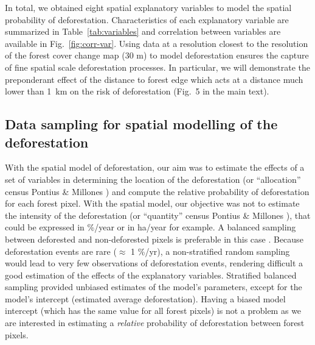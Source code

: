 \documentclass[
  12pt,
]{article}
\begin{document}
In total, we obtained eight spatial explanatory variables to model the spatial probability of deforestation. Characteristics of each explanatory variable are summarized in Table~\ref{tab:variables} and correlation between variables are available in Fig.~\ref{fig:corr-var}. Using data at a resolution closest to the resolution of the forest cover change map (30 m) to model deforestation ensures the capture of fine spatial scale deforestation processes. In particular, we will demonstrate the preponderant effect of the distance to forest edge which acts at a distance much lower than 1~km on the risk of deforestation (Fig.~5 in the main text).

\hypertarget{data-sampling-for-spatial-modelling-of-the-deforestation}{%
\subsection{Data sampling for spatial modelling of the deforestation}\label{data-sampling-for-spatial-modelling-of-the-deforestation}}

With the spatial model of deforestation, our aim was to estimate the effects of a set of variables in determining the location of the deforestation (or ``allocation'' census Pontius \& Millones \citep{Pontius2011}) and compute the relative probability of deforestation for each forest pixel. With the spatial model, our objective was not to estimate the intensity of the deforestation (or ``quantity'' census Pontius \& Millones \citep{Pontius2011}), that could be expressed in \%/year or in ha/year for example. A balanced sampling between deforested and non-deforested pixels is preferable in this case \citep{Vieilledent2013, Dezecache2017}. Because deforestation events are rare (\(\approx\) 1 \%/yr), a non-stratified random sampling would lead to very few observations of deforestation events, rendering difficult a good estimation of the effects of the explanatory variables. Stratified balanced sampling provided unbiased estimates of the model's parameters, except for the model's intercept (estimated average deforestation). Having a biased model intercept (which has the same value for all forest pixels) is not a problem as we are interested in estimating a \emph{relative} probability of deforestation between forest pixels.\\
\end{document}
